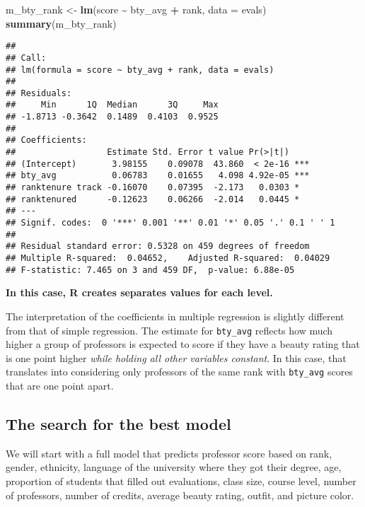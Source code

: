 \documentclass[
]{article}
\newenvironment{Shaded}{\begin{snugshade}}{\end{snugshade}}
\newcommand{\AttributeTok}[1]{\textcolor[rgb]{0.13,0.29,0.53}{#1}}
\newcommand{\FunctionTok}[1]{\textcolor[rgb]{0.13,0.29,0.53}{\textbf{#1}}}
\newcommand{\NormalTok}[1]{#1}
\newcommand{\OtherTok}[1]{\textcolor[rgb]{0.56,0.35,0.01}{#1}}
\newcommand{\SpecialCharTok}[1]{\textcolor[rgb]{0.81,0.36,0.00}{\textbf{#1}}}
\begin{document}
\begin{Shaded}
\begin{Highlighting}[]
\NormalTok{m\_bty\_rank }\OtherTok{\textless{}{-}} \FunctionTok{lm}\NormalTok{(score }\SpecialCharTok{\textasciitilde{}}\NormalTok{ bty\_avg }\SpecialCharTok{+}\NormalTok{ rank, }\AttributeTok{data =}\NormalTok{ evals)}
\FunctionTok{summary}\NormalTok{(m\_bty\_rank)}
\end{Highlighting}
\end{Shaded}

\begin{verbatim}
## 
## Call:
## lm(formula = score ~ bty_avg + rank, data = evals)
## 
## Residuals:
##     Min      1Q  Median      3Q     Max 
## -1.8713 -0.3642  0.1489  0.4103  0.9525 
## 
## Coefficients:
##                  Estimate Std. Error t value Pr(>|t|)    
## (Intercept)       3.98155    0.09078  43.860  < 2e-16 ***
## bty_avg           0.06783    0.01655   4.098 4.92e-05 ***
## ranktenure track -0.16070    0.07395  -2.173   0.0303 *  
## ranktenured      -0.12623    0.06266  -2.014   0.0445 *  
## ---
## Signif. codes:  0 '***' 0.001 '**' 0.01 '*' 0.05 '.' 0.1 ' ' 1
## 
## Residual standard error: 0.5328 on 459 degrees of freedom
## Multiple R-squared:  0.04652,    Adjusted R-squared:  0.04029 
## F-statistic: 7.465 on 3 and 459 DF,  p-value: 6.88e-05
\end{verbatim}

\textbf{In this case, R creates separates values for each level.}

The interpretation of the coefficients in multiple regression is
slightly different from that of simple regression. The estimate for
\texttt{bty\_avg} reflects how much higher a group of professors is
expected to score if they have a beauty rating that is one point higher
\emph{while holding all other variables constant}. In this case, that
translates into considering only professors of the same rank with
\texttt{bty\_avg} scores that are one point apart.

\subsection{The search for the best
model}\label{the-search-for-the-best-model}

We will start with a full model that predicts professor score based on
rank, gender, ethnicity, language of the university where they got their
degree, age, proportion of students that filled out evaluations, class
size, course level, number of professors, number of credits, average
beauty rating, outfit, and picture color.
\end{document}

